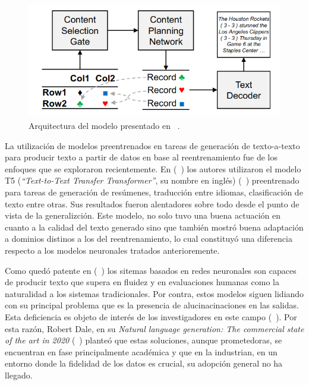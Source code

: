         \begin{figure}[!]
            \begin{center}
                \includegraphics[scale=0.4]{Graphics/lapata_arquitectura.png}
            \end{center}
            \caption{Arquitectura del modelo presentado en ~\cite{puduppully2019dataselandplan}.}
            \label{fig_lapata_arquitectura}
        \end{figure}


    La utilización de modelos preentrenados en tareas de generación de texto-a-texto para producir texto a partir de datos en base al reentrenamiento 
fue de los enfoques que se exploraron recientemente. En (~\cite{kale2020text}) los autores utilizaron el modelo T5 (\emph{“Text-to-Text Transfer Transformer”}, su nombre en inglés) (~\cite{raffel2020exploring})
preentrenado para tareas de generación de resúmenes, traducción entre idiomas, clasificación de texto entre otras. Sus resultados fueron alentadores sobre todo desde el punto de vista de 
la generalizción. Este modelo, no solo tuvo una buena actuación en cuanto a la calidad del texto generado sino que también mostró buena adaptación a dominios distinos a los 
del reentrenamiento, lo cual constituyó una diferencia respecto a los modelos neuronales tratados anterioremente.


    Como quedó patente en (~\cite{wiseman-etal-2017-challenges,ferreira2019neural,duvsek2020evaluating,sharma2022innovations})  los sitemas basados en redes neuronales
 son capaces de producir texto que supera en fluidez y en evaluaciones humanas como la naturalidad a los sistemas tradicionales. Por contra, 
estos modelos siguen lidiando con su principal problema que es la presencia de alucinacinaciones en las salidas. Esta deficiencia es objeto de interés 
de los investigadores en este campo (~\cite{ji2022survey}). Por esta razón, Robert Dale, en su \textit{Natural language generation: The commercial state of
the art in 2020} (~\cite{dale2020natural}) planteó que estas soluciones, aunque prometedoras, se 
encuentran en fase principalmente académica y que en la industrian, en un entorno donde la fidelidad de los datos es crucial, su adopción general no ha llegado.   


